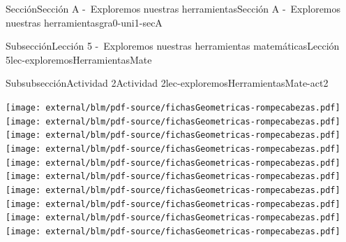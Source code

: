 \begin{sectionptx}{Sección}{Sección A -~Exploremos nuestras herramientas}{}{Sección A -~Exploremos nuestras herramientas}{}{}{gra0-uni1-secA}
\begin{subsectionptx}{Subsección}{Lección 5 -~Exploremos nuestras herramientas matemáticas}{}{Lección 5}{}{}{lec-exploremosHerramientasMate}
\begin{subsubsectionptx}{Subsubsección}{Actividad 2}{}{Actividad 2}{}{}{lec-exploremosHerramientasMate-act2}
\begin{cutoutpage}
\texttt{[image: external/blm/pdf-source/fichasGeometricas-rompecabezas.pdf]}
\clearpage
\texttt{[image: external/blm/pdf-source/fichasGeometricas-rompecabezas.pdf]}
\clearpage
\texttt{[image: external/blm/pdf-source/fichasGeometricas-rompecabezas.pdf]}
\clearpage
\texttt{[image: external/blm/pdf-source/fichasGeometricas-rompecabezas.pdf]}
\clearpage
\texttt{[image: external/blm/pdf-source/fichasGeometricas-rompecabezas.pdf]}
\clearpage
\texttt{[image: external/blm/pdf-source/fichasGeometricas-rompecabezas.pdf]}
\clearpage
\texttt{[image: external/blm/pdf-source/fichasGeometricas-rompecabezas.pdf]}
\clearpage
\texttt{[image: external/blm/pdf-source/fichasGeometricas-rompecabezas.pdf]}
\clearpage
\texttt{[image: external/blm/pdf-source/fichasGeometricas-rompecabezas.pdf]}
\clearpage
\texttt{[image: external/blm/pdf-source/fichasGeometricas-rompecabezas.pdf]}
\end{cutoutpage}
\end{subsubsectionptx}
\end{subsectionptx}
\end{sectionptx}
%
%
\typeout{************************************************}
\typeout{************************************************}
%
